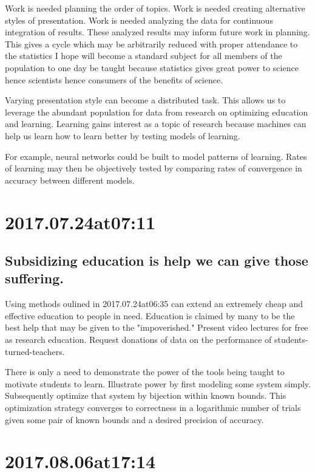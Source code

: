 \begin{enumerate}
\begin{enumerate}
Work is needed planning the order of topics. Work is needed creating alternative styles of presentation. Work is needed analyzing the data for continuous integration of results. These analyzed results may inform future work in planning. This gives a cycle which may be arbitrarily reduced with proper attendance to the statistics I hope will become a standard subject for all members of the population to one day be taught because statistics gives great power to science hence scientists hence consumers of the benefits of science.

Varying presentation style can become a distributed task. This allows us to leverage the abundant population for data from research on optimizing education and learning. Learning gains interest as a topic of research because machines can help us learn how to learn better by testing models of learning.

For example, neural networks could be built to model patterns of learning. Rates of learning may then be objectively tested by comparing rates of convergence in accuracy between different models.

\section*{ 2017.07.24at07:11 }
\subsection*{ Subsidizing education is help we can give those suffering. }
Using methods oulined in 2017.07.24at06:35 can extend an extremely cheap and effective education to people in need. Education is claimed by many to be the best help that may be given to the "impoverished." Present video lectures for free as research education. Request donations of data on the performance of students-turned-teachers.

There is only a need to demonstrate the power of the tools being taught to motivate students to learn. Illustrate power by first modeling some system simply. Subsequently optimize that system by bijection within known bounds. This optimization strategy converges to correctness in a logarithmic number of trials given some pair of known bounds and a desired precision of accuracy.

\section*{ 2017.08.06at17:14 }

\end{enumerate}
\end{enumerate}
